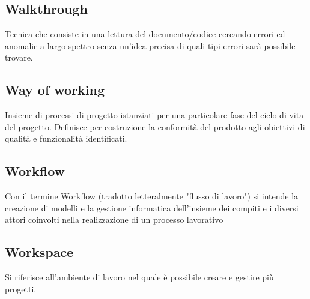 
\subsection*{Walkthrough}
Tecnica che consiste in una lettura del documento/codice cercando errori ed anomalie a largo spettro senza un’idea precisa di quali tipi errori sarà possibile trovare.

\subsection*{Way of working}
Insieme  di  processi  di  progetto  istanziati  per  una  particolare  fase  del  ciclo  di  vita  del
progetto. Definisce  per  costruzione  la  conformità  del  prodotto  agli  obiettivi  di
qualità e funzionalità identificati.

\subsection*{Workflow}
Con il termine Workflow (tradotto letteralmente "flusso di lavoro") si intende la creazione di modelli e la gestione informatica dell'insieme dei compiti e i diversi attori coinvolti nella realizzazione di un processo lavorativo

\subsection*{Workspace}
Si riferisce all’ambiente di lavoro nel quale è possibile creare e gestire più progetti.

